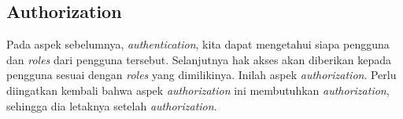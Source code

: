 \subsection{Authorization}
Pada aspek sebelumnya, {\em authentication}, kita dapat mengetahui siapa
pengguna dan {\em roles} dari pengguna tersebut. Selanjutnya hak akses akan
diberikan kepada pengguna sesuai dengan {\em roles} yang dimilikinya. Inilah
aspek {\em authorization}. Perlu diingatkan kembali bahwa aspek {\em
authorization} ini membutuhkan {\em authorization}, sehingga dia letaknya
setelah {\em authorization}.
